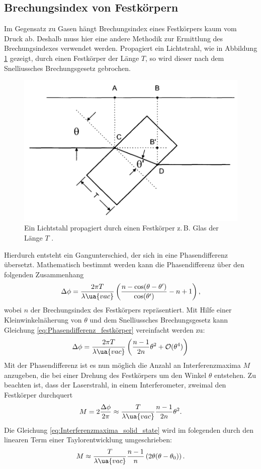 \subsection{Brechungsindex von Festkörpern}
Im Gegensatz zu Gasen hängt Brechungsindex eines Festkörpers kaum vom Druck ab.
Deshalb muss hier eine andere Methodik zur Ermittlung des Brechungsindexes verwendet werden.
Propagiert ein Lichtstrahl, wie in Abbildung \ref{fig:slag} gezeigt, durch einen Festkörper der Länge $T$,
so wird dieser nach dem Snelliussches Brechungsgesetz gebrochen.
\begin{figure}
\centering
\includegraphics[width=0.6\linewidth]{./content/images/slab.png}
\caption{Ein Lichtstahl propagiert durch einen Festkörper z.\,B. Glas der Länge $T$ \cite{anleitung64}.}
\label{fig:slag}
\end{figure}
Hierdurch entsteht ein Gangunterschied, der sich in eine Phasendifferenz übersetzt.
Mathematisch bestimmt werden kann die Phasendifferenz über den folgenden Zusammenhang
\begin{equation}
  \label{eq:Phasendifferenz_festkörper}
  \Delta\phi=\frac{ 2\pi T }{ \lambda\ua{vac} }\left( \frac{ n-\cos(\theta-\theta') }{ \cos(\theta') } - n+1\right),
\end{equation}
wobei $n$ der Brechungsindex des Festkörpers repräsentiert.
Mit Hilfe einer Kleinwinkelnäherung von $\theta$ und dem Snelliussches Brechungsgesetz kann
Gleichung \eqref{eq:Phasendifferenz_festkörper} vereinfacht werden zu:
\begin{equation}
  \Delta\phi=\frac{ 2\pi T }{ \lambda\ua{vac} }\left( \frac{ n-1 }{ 2n }\theta^2 + \mathcal{O}(\theta^4)\right)
\end{equation}
Mit der Phasendifferenz ist es nun möglich die Anzahl an Interferenzmaxima $M$ anzugeben, die bei einer Drehung
des Festkörpers um den Winkel $\theta$ entstehen. Zu beachten ist, dass der Laserstrahl, in einem Interferometer, zweimal den Festkörper durchquert
\begin{equation}
  \label{eq:Interferenzmaxima_solid_state}
  M=2\frac{\Delta\phi}{2\pi}\approx \frac{T}{\lambda\ua{vac}}\frac{n-1}{2n}\theta^2.
\end{equation}
Die Gleichung \eqref{eq:Interferenzmaxima_solid_state} wird im folegenden
durch den linearen Term einer Taylorentwicklung umgeschrieben:
\begin{equation}
\label{eq:entwicklung_interferenzmaxima}
  M\approx\frac{T}{\lambda\ua{vac}}\frac{n-1}{n}\left( 2\theta(\theta-\theta_0)\right).
\end{equation}
